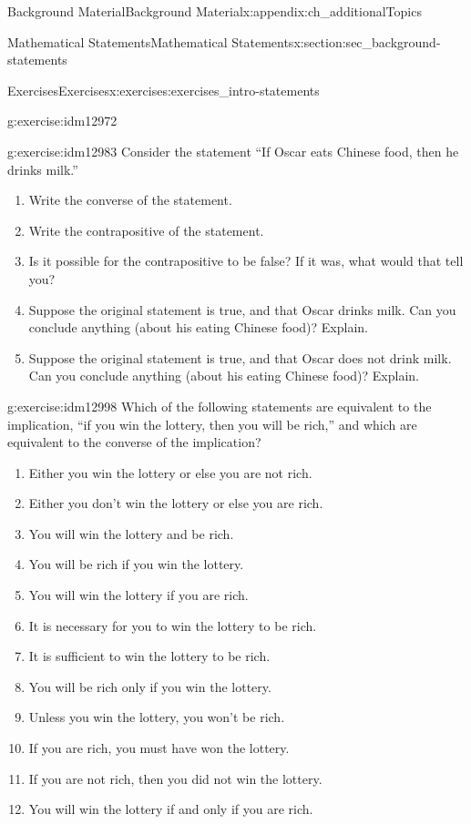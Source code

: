\documentclass[oneside,10pt,]{book}
\numberwithin{equation}{chapter}
\begin{document}
\begin{appendixptx}{Background Material}{}{Background Material}{}{}{x:appendix:ch_additionalTopics}
\begin{sectionptx}{Mathematical Statements}{}{Mathematical Statements}{}{}{x:section:sec_background-statements}
\begin{exercises-subsection}{Exercises}{}{Exercises}{}{}{x:exercises:exercises_intro-statements}
\begin{divisionexercise}{3}{}{}{g:exercise:idm12972}
\begin{enumerate}[label=(\alph*)]
\end{enumerate}
\end{divisionexercise}%
\begin{divisionexercise}{4}{}{}{g:exercise:idm12983}%
Consider the statement ``If Oscar eats Chinese food, then he drinks milk.''%
%
\begin{enumerate}[label=(\alph*)]
\item{}Write the converse of the statement.%
\item{}Write the contrapositive of the statement.%
\item{}Is it possible for the contrapositive to be false? If it was, what would that tell you?%
\item{}Suppose the original statement is true, and that Oscar drinks milk. Can you conclude anything (about his eating Chinese food)? Explain.%
\item{}Suppose the original statement is true, and that Oscar does not drink milk. Can you conclude anything (about his eating Chinese food)? Explain.%
\end{enumerate}
\end{divisionexercise}%
\begin{divisionexercise}{5}{}{}{g:exercise:idm12998}%
Which of the following statements are equivalent to the implication, ``if you win the lottery, then you will be rich,'' and which are equivalent to the converse of the implication?%
%
\begin{enumerate}[label=(\alph*)]
\item{}Either you win the lottery or else you are not rich.%
\item{}Either you don't win the lottery or else you are rich.%
\item{}You will win the lottery and be rich.%
\item{}You will be rich if you win the lottery.%
\item{}You will win the lottery if you are rich.%
\item{}It is necessary for you to win the lottery to be rich.%
\item{}It is sufficient to win the lottery to be rich.%
\item{}You will be rich only if you win the lottery.%
\item{}Unless you win the lottery, you won't be rich.%
\item{}If you are rich, you must have won the lottery.%
\item{}If you are not rich, then you did not win the lottery.%
\item{}You will win the lottery if and only if you are rich.%

\end{enumerate}
\end{divisionexercise}
\end{exercises-subsection}
\end{sectionptx}
\end{appendixptx}
\end{document}
